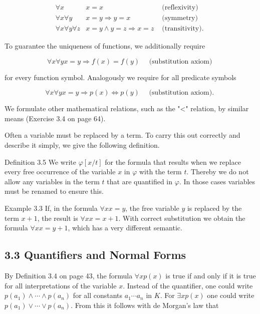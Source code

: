 \documentclass[10pt]{article}
\begin{document}
\[
\begin{array}{rll}
\forall x & x=x & \text { (reflexivity) } \\
\forall x \forall y & x=y \Rightarrow y=x & \text { (symmetry) }  \tag{3.1}\\
\forall x \forall y \forall z & x=y \wedge y=z \Rightarrow x=z & \text { (transitivity). }
\end{array}
\]

To guarantee the uniqueness of functions, we additionally require


\begin{equation*}
\forall x \forall y x=y \Rightarrow f(x)=f(y) \quad \text { (substitution axiom) } \tag{3.2}
\end{equation*}


for every function symbol. Analogously we require for all predicate symbols


\begin{equation*}
\forall x \forall y x=y \Rightarrow p(x) \Leftrightarrow p(y) \quad \text { (substitution axiom). } \tag{3.3}
\end{equation*}


We formulate other mathematical relations, such as the "<" relation, by similar means (Exercise 3.4 on page 64).

Often a variable must be replaced by a term. To carry this out correctly and describe it simply, we give the following definition.

Definition 3.5 We write $\varphi[x / t]$ for the formula that results when we replace every free occurrence of the variable $x$ in $\varphi$ with the term $t$. Thereby we do not allow any variables in the term $t$ that are quantified in $\varphi$. In those cases variables must be renamed to ensure this.

Example 3.3 If, in the formula $\forall x x=y$, the free variable $y$ is replaced by the term $x+1$, the result is $\forall x x=x+1$. With correct substitution we obtain the formula $\forall x x=y+1$, which has a very different semantic.

\subsection*{3.3 Quantifiers and Normal Forms}
By Definition 3.4 on page 43, the formula $\forall x p(x)$ is true if and only if it is true for all interpretations of the variable $x$. Instead of the quantifier, one could write $p\left(a_{1}\right) \wedge \cdots \wedge p\left(a_{n}\right)$ for all constants $a_{1} \cdots a_{n}$ in $K$. For $\exists x p(x)$ one could write $p\left(a_{1}\right) \vee \cdots \vee p\left(a_{n}\right)$. From this it follows with de Morgan's law that
\end{document}
